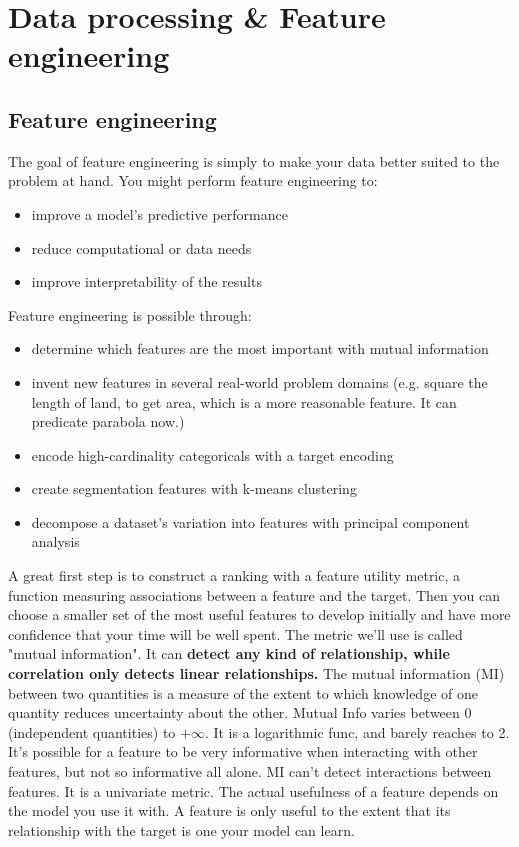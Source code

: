 \documentclass[12pt]{report}
\begin{document}
\section{Data processing \& Feature engineering}
\label{sec:featureEngineering}

\subsection{Feature engineering}
The goal of feature engineering is simply to make your data better suited to the problem at hand. You might perform feature engineering to:
\begin{itemize}
  \item improve a model's predictive performance
  \item reduce computational or data needs
  \item improve interpretability of the results
\end{itemize}

Feature engineering is possible through:
\begin{itemize}
  \item determine which features are the most important with mutual information
  \item invent new features in several real-world problem domains (e.g. square the length of land, to get area, which is a more reasonable feature. It can predicate parabola now.)
  \item encode high-cardinality categoricals with a target encoding
  \item create segmentation features with k-means clustering
  \item decompose a dataset's variation into features with principal component analysis
\end{itemize}

A great first step is to construct a ranking with a feature utility metric, a function measuring associations between a feature and the target. Then you can choose a smaller set of the most useful features to develop initially and have more confidence that your time will be well spent. The metric we'll use is called "mutual information". It can \textbf{detect any kind of relationship, while correlation only detects linear relationships.} The mutual information (MI) between two quantities is a measure of the extent to which knowledge of one quantity reduces uncertainty about the other. Mutual Info varies between 0 (independent quantities) to $+ \infty $. It is a logarithmic func, and barely reaches to 2. It's possible for a feature to be very informative when interacting with other features, but not so informative all alone. MI can't detect interactions between features. It is a univariate metric.
The actual usefulness of a feature depends on the model you use it with. A feature is only useful to the extent that its relationship with the target is one your model can learn.
\end{document}
